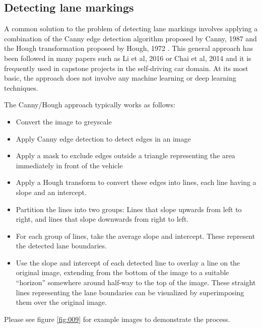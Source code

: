 \documentclass[11pt,twoside]{report}
\begin{document}
\subsection{Detecting lane markings}

A common solution to the problem of detecting lane markings involves applying a combination of the Canny edge detection algorithm proposed by Canny, 1987 \cite{canny} and the Hough transformation proposed by Hough, 1972 \cite{hough}.  This general approach has been followed in many papers such as  Li et al, 2016 \cite{canny_example} or Chai et al, 2014 \cite{canny_example2} and it is frequently used in capstone projects in the self-driving car domain.  At its most basic, the approach does not involve any machine learning or deep learning techniques.

The Canny/Hough approach typically works as follows:

\begin{itemize}
\item{Convert the image to greyscale}
\item{Apply Canny edge detection to detect edges in an image \cite{canny}}
\item{Apply a mask to exclude edges outside a triangle representing the area immediately in front of the vehicle}
\item{Apply a Hough transform \cite{hough} to convert these edges into lines, each line having a slope and an intercept.}
\item{Partition the lines into two groups:  Lines that slope upwards from left to right, and lines that slope downwards from right to left.}
\item{For each group of lines, take the average slope and intercept.  These represent the detected lane boundaries.}
\item{Use the slope and intercept of each detected line to overlay a line on the original image, extending from the bottom of the image to a suitable ``horizon'' somewhere around half-way to the top of the image.  These straight lines representing the lane boundaries can be visualized by superimposing them over the original image.}
\end{itemize}

Please see figure \ref{fig:009} for example images to demonstrate the process.
\end{document}
